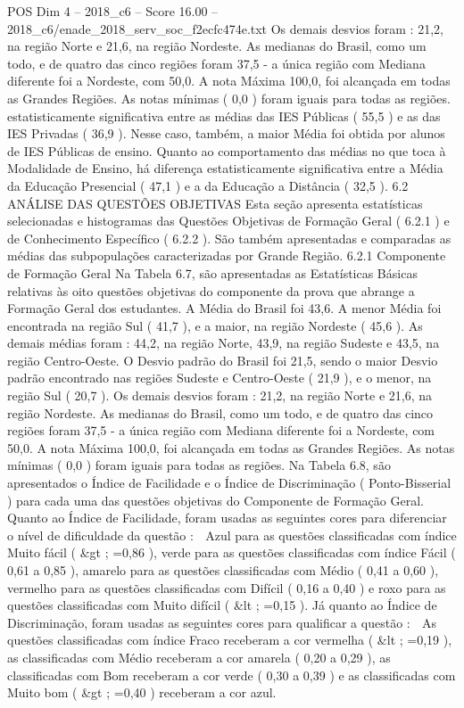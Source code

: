 \begin{textsample}{POS Dim 4 – 2018\_c6 – Score 16.00 – 2018\_c6/enade\_2018\_serv\_soc\_f2ecfc474e.txt}
Os demais desvios foram : 21,2, na região Norte e 21,6, na região Nordeste.
As medianas do Brasil, como um todo, e de quatro das cinco regiões foram 37,5 - a única região com Mediana diferente foi a Nordeste, com 50,0.
A nota Máxima 100,0, foi alcançada em todas as Grandes Regiões.
As notas mínimas ( 0,0 ) foram iguais para todas as regiões. estatisticamente significativa entre as médias das IES Públicas ( 55,5 ) e as das IES Privadas ( 36,9 ).
Nesse caso, também, a maior Média foi obtida por alunos de IES Públicas de ensino.
Quanto ao comportamento das médias no que toca à Modalidade de Ensino, há diferença estatisticamente significativa entre a Média da Educação Presencial ( 47,1 ) e a da Educação a Distância ( 32,5 ). 6.2 ANÁLISE DAS QUESTÕES OBJETIVAS Esta seção apresenta estatísticas selecionadas e histogramas das Questões Objetivas de Formação Geral ( 6.2.1 ) e de Conhecimento Específico ( 6.2.2 ).
São também apresentadas e comparadas as médias das subpopulações caracterizadas por Grande Região. 6.2.1 Componente de Formação Geral Na Tabela 6.7, são apresentadas as Estatísticas Básicas relativas às oito questões objetivas do componente da prova que abrange a Formação Geral dos estudantes.
A Média do Brasil foi 43,6.
A menor Média foi encontrada na região Sul ( 41,7 ), e a maior, na região Nordeste ( 45,6 ).
As demais médias foram : 44,2, na região Norte, 43,9, na região Sudeste e 43,5, na região Centro-Oeste.
O Desvio padrão do Brasil foi 21,5, sendo o maior Desvio padrão encontrado nas regiões Sudeste e Centro-Oeste ( 21,9 ), e o menor, na região Sul ( 20,7 ).
Os demais desvios foram : 21,2, na região Norte e 21,6, na região Nordeste.
As medianas do Brasil, como um todo, e de quatro das cinco regiões foram 37,5 - a única região com Mediana diferente foi a Nordeste, com 50,0.
A nota Máxima 100,0, foi alcançada em todas as Grandes Regiões.
As notas mínimas ( 0,0 ) foram iguais para todas as regiões.
Na Tabela 6.8, são apresentados o Índice de Facilidade e o Índice de Discriminação ( Ponto-Bisserial ) para cada uma das questões objetivas do Componente de Formação Geral.
Quanto ao Índice de Facilidade, foram usadas as seguintes cores para diferenciar o nível de dificuldade da questão :  Azul para as questões classificadas com índice Muito fácil ( \&gt ; =0,86 ), verde para as questões classificadas com índice Fácil ( 0,61 a 0,85 ), amarelo para as questões classificadas com Médio ( 0,41 a 0,60 ), vermelho para as questões classificadas com Difícil ( 0,16 a 0,40 ) e roxo para as questões classificadas com Muito difícil ( \&lt ; =0,15 ).
Já quanto ao Índice de Discriminação, foram usadas as seguintes cores para qualificar a questão :  As questões classificadas com índice Fraco receberam a cor vermelha ( \&lt ; =0,19 ), as classificadas com Médio receberam a cor amarela ( 0,20 a 0,29 ), as classificadas com Bom receberam a cor verde ( 0,30 a 0,39 ) e as classificadas com Muito bom ( \&gt ; =0,40 ) receberam a cor azul.

\end{textsample}
